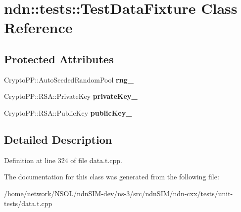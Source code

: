 \hypertarget{classndn_1_1tests_1_1TestDataFixture}{}\section{ndn\+:\+:tests\+:\+:Test\+Data\+Fixture Class Reference}
\label{classndn_1_1tests_1_1TestDataFixture}
\subsection*{Protected Attributes}
\begin{DoxyCompactItemize}
\item 
Crypto\+P\+P\+::\+Auto\+Seeded\+Random\+Pool {\bfseries rng\+\_\+}\hypertarget{classndn_1_1tests_1_1TestDataFixture_a1d32a49712404dd807ef7bc3f33c4eea}{}\label{classndn_1_1tests_1_1TestDataFixture_a1d32a49712404dd807ef7bc3f33c4eea}

\item 
Crypto\+P\+P\+::\+R\+S\+A\+::\+Private\+Key {\bfseries private\+Key\+\_\+}\hypertarget{classndn_1_1tests_1_1TestDataFixture_a1ce1b7599c4a48d9a019276f93d347d0}{}\label{classndn_1_1tests_1_1TestDataFixture_a1ce1b7599c4a48d9a019276f93d347d0}

\item 
Crypto\+P\+P\+::\+R\+S\+A\+::\+Public\+Key {\bfseries public\+Key\+\_\+}\hypertarget{classndn_1_1tests_1_1TestDataFixture_abe840bf10903526c0f95f045402a5164}{}\label{classndn_1_1tests_1_1TestDataFixture_abe840bf10903526c0f95f045402a5164}

\end{DoxyCompactItemize}


\subsection{Detailed Description}


Definition at line 324 of file data.\+t.\+cpp.



The documentation for this class was generated from the following file\+:\begin{DoxyCompactItemize}
\item 
/home/network/\+N\+S\+O\+L/ndn\+S\+I\+M-\/dev/ns-\/3/src/ndn\+S\+I\+M/ndn-\/cxx/tests/unit-\/tests/data.\+t.\+cpp\end{DoxyCompactItemize}
